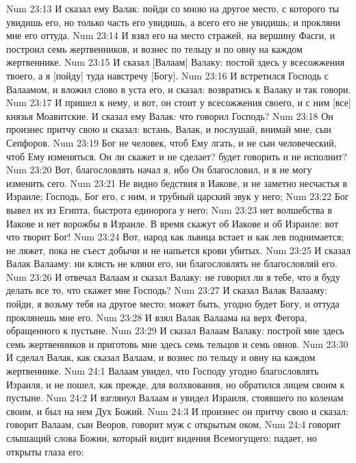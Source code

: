 \vs Num 23:13 И сказал ему Валак: пойди со мною на другое место, с которого ты увидишь его, но только часть его увидишь, а всего его не увидишь; и прокляни мне его оттуда.
\vs Num 23:14 И взял его на место стражей, на вершину  Фасги, и построил семь жертвенников, и вознес по тельцу и по овну на каждом жертвеннике.
\vs Num 23:15 И сказал [Валаам] Валаку: постой здесь у всесожжения твоего, а я [пойду] туда навстречу [Богу].
\vs Num 23:16 И встретился Господь с Валаамом, и вложил слово в уста его, и сказал: возвратись к Валаку и так говори.
\vs Num 23:17 И пришел к нему, и вот, он стоит у всесожжения своего, и с ним [все] князья Моавитские. И сказал ему Валак: что говорил Господь?
\vs Num 23:18 Он произнес притчу свою и сказал: встань, Валак, и послушай, внимай мне, сын Сепфоров.
\vs Num 23:19 Бог не человек, чтоб Ему лгать, и не сын человеческий, чтоб Ему изменяться. Он ли скажет и не сделает? будет говорить и не исполнит?
\vs Num 23:20 Вот, благословлять начал я, ибо Он благословил, и я не могу изменить сего.
\vs Num 23:21 Не видно бедствия в Иакове, и не заметно несчастья в Израиле; Господь, Бог его, с ним, и трубный царский звук у него;
\vs Num 23:22 Бог вывел их из Египта, быстрота единорога у него;
\vs Num 23:23 нет волшебства в Иакове и нет ворожбы в Израиле. В  время скажут об Иакове и об Израиле: вот что творит Бог!
\vs Num 23:24 Вот, народ как львица встает и как лев поднимается; не ляжет, пока не съест добычи и не напьется крови убитых.
\vs Num 23:25 И сказал Валак Валааму: ни клясть не кляни его, ни благословлять не благословляй его.
\vs Num 23:26 И отвечал Валаам и сказал Валаку: не говорил ли я тебе, что я буду делать все то, что скажет мне Господь?
\vs Num 23:27 И сказал Валак Валааму: пойди, я возьму тебя на другое место; может быть, угодно будет Богу, и оттуда проклянешь мне его.
\vs Num 23:28 И взял Валак Валаама на верх Фегора, обращенного к пустыне.
\vs Num 23:29 И сказал Валаам Валаку: построй мне здесь семь жертвенников и приготовь мне здесь семь тельцов и семь овнов.
\vs Num 23:30 И сделал Валак, как сказал Валаам, и вознес по тельцу и овну на каждом жертвеннике.
\vs Num 24:1 Валаам увидел, что Господу угодно благословлять Израиля, и не пошел, как прежде, для волхвования, но обратился лицем своим к пустыне.
\vs Num 24:2 И взглянул Валаам и увидел Израиля, стоявшего по коленам своим, и был на нем Дух Божий.
\vs Num 24:3 И произнес он притчу свою и сказал: говорит Валаам, сын Веоров, говорит муж с открытым оком,
\vs Num 24:4 говорит слышащий слова Божии, который видит видения Всемогущего; падает, но открыты глаза его:
